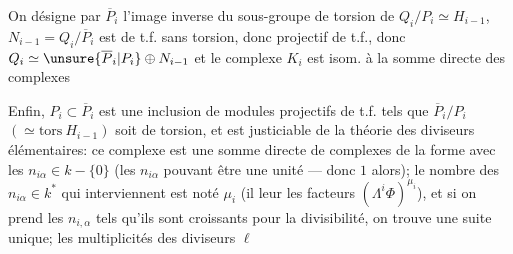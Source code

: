 On désigne par $\overline P_i$ 
l'image inverse  du
sous-groupe de torsion de $Q_i/P_i\simeq H_{i-1}$,
$N_{i-1}=Q_i/\overline P_i$ est de t.f. sans torsion, donc
projectif de t.f., donc $Q_i\simeq\unsure{\overline P_i|P_i}\oplus N_{i-1}$
et le complexe $K_i$ est isom. à la
somme directe des complexes

Enfin, $P_i\subset\overline P_i$ est une inclusion de
modules projectifs de t.f. tels que
$\overline P_i/P_i$ $(\simeq\mathrm{tors}\ H_{i-1})$ soit de torsion,
et est justiciable de la théorie des
diviseurs élémentaires: 
ce complexe est une somme directe
de complexes de la forme
avec les $n_{i\alpha}\in k-\{0\}$ (les $n_{i\alpha}$ pouvant être
une unité --- donc $1$ alors); le
nombre des $n_{i\alpha}\in k^*$ qui interviennent
est noté $\mu_i$ (il leur 
les facteurs $(\Lambda^i\Phi)^{\mu_i}$), et si on
prend les  $n_{i,\alpha}$ tels qu'ils sont croissants
pour la divisibilité, on trouve une suite
unique; les multiplicités  des diviseurs $\ell$
